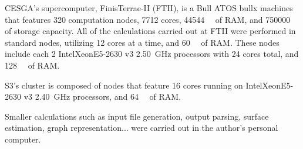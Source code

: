 CESGA's supercomputer, FinisTerrae-II (FTII), is a Bull ATOS bullx machines that features \num{320} computation nodes, \num{7712} cores, \SI{44544}{\giga\byte} of RAM, and \SI{750000}{\giga\byte} of storage capacity.
All of the calculations carried out at FTII were performed in standard nodes, utilizing \num{12} cores at a time, and \SI{60}{\giga\byte} of RAM.
These nodes include each 2 Intel\textregistered Xeon\textregistered E5-2630 v3 \SI{2.50}{\giga\hertz} processors with \num{24} cores total, and \SI{128}{\giga\byte} of RAM.

S3's cluster is composed of nodes that feature \num{16} cores running on Intel\textregistered Xeon\textregistered E5-2630 v3 \SI{2.40}{\giga\hertz} processors, and \SI{64}{\giga\byte} of RAM.

Smaller calculations such as input file generation, output parsing, surface estimation, graph representation... were carried out in the author's personal computer.
